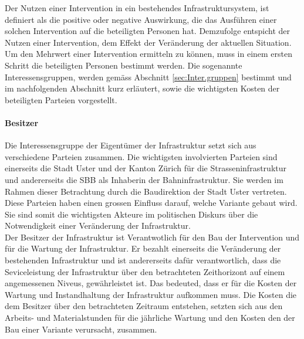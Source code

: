 %
%
%
%

\label{subsec:Gruppen}

Der Nutzen einer Intervention in ein bestehendes Infrastruktursystem, ist definiert als die positive oder negative Auswirkung, die das Ausführen einer solchen Intervention auf die beteiligten Personen hat. Demzufolge entspicht der Nutzen einer Intervention, dem Effekt der Veränderung der aktuellen Situation. Um den Mehrwert einer Intervention ermitteln zu können, muss in einem ersten Schritt die beteiligten Personen bestimmt werden. Die sogenannte Interessensgruppen, werden gemäss Abschnitt \ref{sec:Inter.gruppen} bestimmt und im nachfolgenden Abschnitt kurz erläutert, sowie die wichtigsten Kosten der beteiligten Parteien vorgestellt.

\paragraph{Besitzer}

Die Interessensgruppe der Eigentümer der Infrastruktur setzt sich aus verschiedene Parteien zusammen. Die wichtigsten involvierten Parteien sind einerseits die Stadt Uster und der Kanton Zürich für die Strasseninfrastruktur und andererseits die SBB als Inhaberin der Bahninfrastruktur. Sie werden im Rahmen dieser Betrachtung durch die Baudirektion der Stadt Uster vertreten. 
Diese Parteien haben einen grossen Einfluss darauf, welche Variante gebaut wird. Sie sind somit die wichtigsten Akteure im politischen Diskurs über die Notwendigkeit einer Veränderung der Infrastruktur. \\ 
Der Besitzer der Infrastruktur ist Verantwotlich für den Bau der Intervention und für die Wartung der Infrastruktur. Er bezahlt einerseits die Veränderung der bestehenden Infrastruktur und ist andererseits dafür verantwortlich, dass die Seviceleistung der Infrastruktur über den betrachteten Zeithorizont auf einem angemessenen Niveus, gewährleistet ist. Das bedeuted, dass er für die Kosten der Wartung und Instandhaltung der Infrastruktur aufkommen muss. Die Kosten die dem Besitzer über den betrachteten Zeitraum entstehen, setzten sich aus den Arbeits- und Materialstunden für die jährliche Wartung und den Kosten den der Bau einer Variante verursacht, zusammen. 


